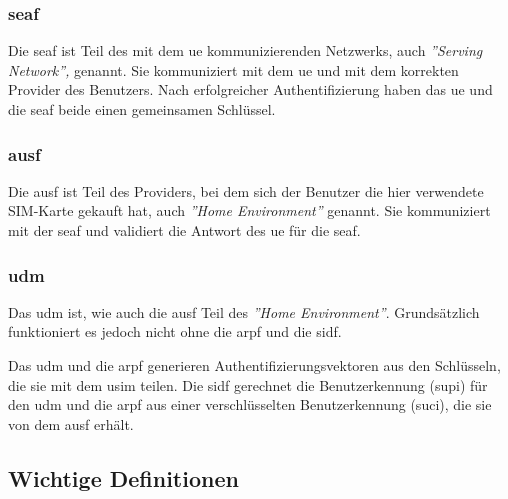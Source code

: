 \subsubsection{\gls{seaf}}

Die \gls{seaf} ist Teil des mit dem \gls{ue} kommunizierenden Netzwerks, auch \textit{''Serving Network''‚} genannt.
Sie kommuniziert mit dem \gls{ue} und mit dem korrekten Provider des Benutzers.
Nach erfolgreicher Authentifizierung haben das \gls{ue} und die \gls{seaf} beide einen gemeinsamen Schl\"ussel.%

\subsubsection{\gls{ausf}}

Die \gls{ausf} ist Teil des Providers, bei dem sich der Benutzer die hier verwendete SIM-Karte gekauft hat, auch \textit{''Home Environment''} genannt.
Sie kommuniziert mit der \gls{seaf} und validiert die Antwort des \gls{ue} f\"ur die \gls{seaf}.

\subsubsection{\gls{udm}}

Das \gls{udm} ist, wie auch die \gls{ausf} Teil des \textit{''Home Environment''}.
Grunds\"atzlich funktioniert es jedoch nicht ohne die \gls{arpf} und die \gls{sidf}.

Das \gls{udm} und die \gls{arpf} generieren Authentifizierungsvektoren aus den Schl\"usseln, die sie mit dem \gls{usim} teilen.
Die \gls{sidf} gerechnet die Benutzerkennung (\gls{supi}) f\"ur den \gls{udm} und die \gls{arpf} aus einer verschl\"usselten Benutzerkennung (\gls{suci}), die sie von dem \gls{ausf} erh\"alt.


\subsection{Wichtige Definitionen}

